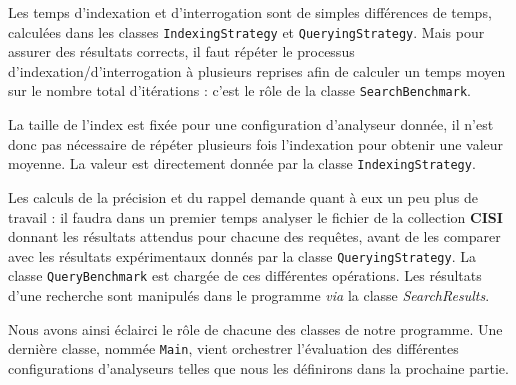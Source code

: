 Les temps d’indexation et d’interrogation sont de simples différences de temps, calculées dans les classes \texttt{IndexingStrategy} et \texttt{QueryingStrategy}. Mais pour assurer des résultats corrects, il faut répéter le processus d’indexation/d’interrogation à plusieurs reprises afin de calculer un temps moyen sur le nombre total d’itérations : c’est le rôle de la classe \texttt{SearchBenchmark}.

La taille de l’index est fixée pour une configuration d’analyseur donnée, il n’est donc pas nécessaire de répéter plusieurs fois l’indexation pour obtenir une valeur moyenne. La valeur est directement donnée par la classe \texttt{IndexingStrategy}.

Les calculs de la précision et du rappel demande quant à eux un peu plus de travail : il faudra dans un premier temps analyser le fichier de la collection \textbf{CISI} donnant les résultats attendus pour chacune des requêtes, avant de les comparer avec les résultats expérimentaux donnés par la classe \texttt{QueryingStrategy}. La classe \texttt{QueryBenchmark} est chargée de ces différentes opérations. Les résultats d’une recherche sont manipulés dans le programme \textit{via} la classe \textit{SearchResults}.

Nous avons ainsi éclairci le rôle de chacune des classes de notre programme. Une dernière classe, nommée \texttt{Main}, vient orchestrer l’évaluation des différentes configurations d’analyseurs telles que nous les définirons dans la prochaine partie.

